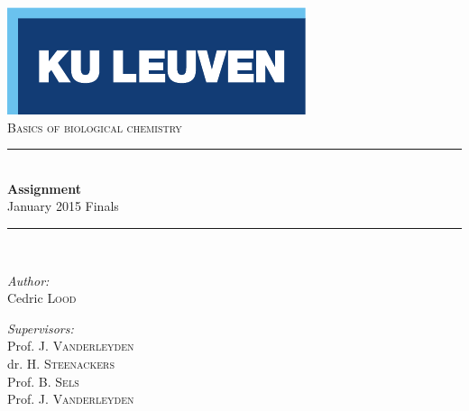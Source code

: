 \begin{titlepage}
  \begin{center}
    
    \includegraphics[scale=1.5]{Figures/kuleuven_logo.pdf}~\\[4.5cm]
    
    \textsc{\Large Basics of biological chemistry}\\[0.5cm]
    
    \rule{\linewidth}{0.3mm}\\[0.4cm]
    {\huge \bfseries Assignment} \\[0.4cm]
    {\large January 2015 Finals} \\[0.4cm]
    \rule{\linewidth}{0.3mm}\\[1.5cm]
    
    \begin{minipage}{0.4\textwidth}
      \begin{flushleft} \large
        \emph{Author:}\\
        Cedric \textsc{Lood}\\
      \end{flushleft}
    \end{minipage}
    \begin{minipage}{0.4\textwidth}
      \begin{flushright} \large
        \emph{Supervisors:} \\
        Prof. J. \textsc{Vanderleyden}\\
        dr. H. \textsc{Steenackers}\\
        Prof. B. \textsc{Sels}\\
        Prof. J. \textsc{Vanderleyden}
      \end{flushright}
    \end{minipage}
    
    \vfill
    

\end{center}
\end{titlepage}
